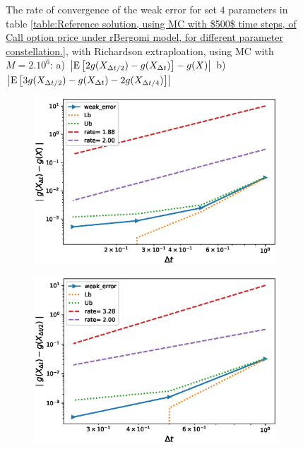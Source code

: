 \documentclass[11pt]{article}
\newcommand{\expt}[1]{\mathrm{E}\left[#1\right]}
\begin{document}
\begin{figure}[!htbp]
	\caption{The rate of convergence of the weak error for set $4$ parameters in table \ref{table:Reference solution, using MC with $500$ time steps, of Call option price under rBergomi model, for different parameter constellation.}, with Richardson extraploation, using MC with $M=2.10^6$: a) $\abs{\expt{2 g(X_{\Delta t/2}) -g(X_{\Delta t})}-g(X)}$  b) $\abs{\expt{3 g(X_{\Delta t/2})-g(X_{\Delta t})-2 g(X_{\Delta t/4})}}$ }
	\label{fig:Weak_rate_H_007_with_rich_K12}
\end{figure}






\begin{figure}[!htbp]
	\centering
	\begin{subfigure}{.4\textwidth}
		\centering
		\includegraphics[width=1\linewidth]{./figures/rBergomi_weak_error_rates/with_richardson/H_002/weak_convergence_order_Bergomi_H_002_K_1_M_1_10_7_richardson_relative}
		\caption{}
		\label{fig:sub3}
	\end{subfigure}%
	\begin{subfigure}{.4\textwidth}
		\centering
		\includegraphics[width=1\linewidth]{./figures/rBergomi_weak_error_rates/with_richardson/H_002/weak_convergence_order_differences_Bergomi_H_002_K_1_M_1_10_7_richardson_relative}
		\caption{}
		\label{fig:sub4}
	\end{subfigure}
	

\end{figure}
\end{document}
